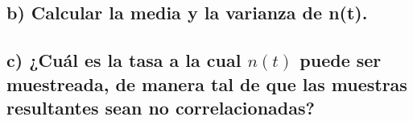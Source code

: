 \subsection*{b) Calcular la media y la varianza de n(t).}

\subsection*{c) ¿Cuál es la tasa a la cual $n(t)$ puede ser muestreada, de manera tal de que las muestras resultantes sean no correlacionadas?}